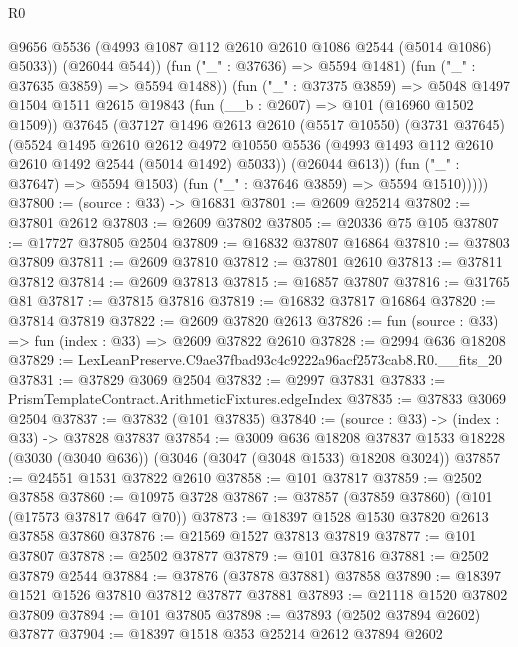 \begin{lexlean}{R0}
\begin{coremodule}
                @9656
                @5536
                (@4993 @1087 @112 @2610 @2610 @1086 @2544 (@5014 @1086) @5033))
              (@26044 @544))
            (fun ("_" : @37636) => @5594 @1481)
            (fun ("_" : @37635 @3859) => @5594 @1488))
          (fun ("_" : @37375 @3859) =>
          @5048
            @1497
            @1504
            @1511
            @2615
            @19843
            (fun (__b : @2607) => @101 (@16960 @1502 @1509))
            @37645
            (@37127
              @1496
              @2613
              @2610
              (@5517 @10550)
              (@3731 @37645)
              (@5524
                @1495
                @2610
                @2612
                @4972
                @10550
                @5536
                (@4993 @1493 @112 @2610 @2610 @1492 @2544 (@5014 @1492) @5033))
              (@26044 @613))
            (fun ("_" : @37647) => @5594 @1503)
            (fun ("_" : @37646 @3859) => @5594 @1510)))))
@37800 := (source : @33) -> @16831
@37801 := @2609 @25214
@37802 := @37801 @2612
@37803 := @2609 @37802
@37805 := @20336 @75 @105
@37807 := @17727 @37805 @2504
@37809 := @16832 @37807 @16864
@37810 := @37803 @37809
@37811 := @2609 @37810
@37812 := @37801 @2610
@37813 := @37811 @37812
@37814 := @2609 @37813
@37815 := @16857 @37807
@37816 := @31765 @81
@37817 := @37815 @37816
@37819 := @16832 @37817 @16864
@37820 := @37814 @37819
@37822 := @2609 @37820 @2613
@37826 := fun (source : @33) => fun (index : @33) => @2609 @37822 @2610
@37828 := @2994 @636 @18208
@37829 := LexLeanPreserve.C9ae37fbad93c4c9222a96acf2573cab8.R0.__fits_20
@37831 := @37829 @3069 @2504
@37832 := @2997 @37831
@37833 := PrismTemplateContract.ArithmeticFixtures.edgeIndex
@37835 := @37833 @3069 @2504
@37837 := @37832 (@101 @37835)
@37840 := (source : @33) -> (index : @33) -> @37828 @37837
@37854 := @3009
    @636
    @18208
    @37837
    @1533
    @18228
    (@3030 (@3040 @636))
    (@3046 (@3047 (@3048 @1533) @18208 @3024))
@37857 := @24551 @1531 @37822 @2610
@37858 := @101 @37817
@37859 := @2502 @37858
@37860 := @10975 @3728
@37867 := @37857 (@37859 @37860) (@101 (@17573 @37817 @647 @70))
@37873 := @18397 @1528 @1530 @37820 @2613 @37858 @37860
@37876 := @21569 @1527 @37813 @37819
@37877 := @101 @37807
@37878 := @2502 @37877
@37879 := @101 @37816
@37881 := @2502 @37879 @2544
@37884 := @37876 (@37878 @37881) @37858
@37890 := @18397 @1521 @1526 @37810 @37812 @37877 @37881
@37893 := @21118 @1520 @37802 @37809
@37894 := @101 @37805
@37898 := @37893 (@2502 @37894 @2602) @37877
@37904 := @18397 @1518 @353 @25214 @2612 @37894 @2602

\end{coremodule}
\end{lexlean}
